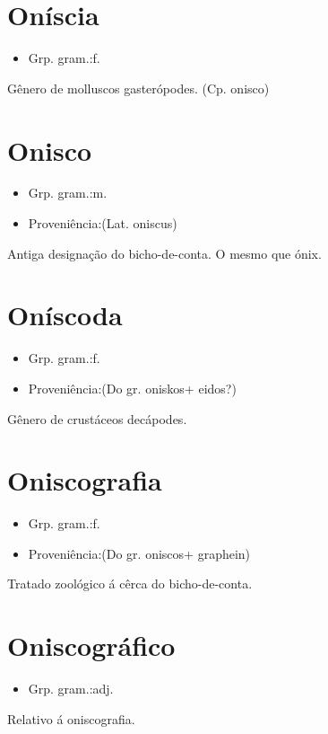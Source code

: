 \section{Oníscia}
\begin{itemize}
\item {Grp. gram.:f.}
\end{itemize}
Gênero de molluscos gasterópodes.
(Cp. \textunderscore onisco\textunderscore )
\section{Onisco}
\begin{itemize}
\item {Grp. gram.:m.}
\end{itemize}
\begin{itemize}
\item {Proveniência:(Lat. \textunderscore oniscus\textunderscore )}
\end{itemize}
Antiga designação do bicho-de-conta.
O mesmo que \textunderscore ónix\textunderscore .
\section{Oníscoda}
\begin{itemize}
\item {Grp. gram.:f.}
\end{itemize}
\begin{itemize}
\item {Proveniência:(Do gr. \textunderscore oniskos\textunderscore  + \textunderscore eidos\textunderscore ?)}
\end{itemize}
Gênero de crustáceos decápodes.
\section{Oniscografia}
\begin{itemize}
\item {Grp. gram.:f.}
\end{itemize}
\begin{itemize}
\item {Proveniência:(Do gr. \textunderscore oniscos\textunderscore  + \textunderscore graphein\textunderscore )}
\end{itemize}
Tratado zoológico á cêrca do bicho-de-conta.
\section{Oniscográfico}
\begin{itemize}
\item {Grp. gram.:adj.}
\end{itemize}
Relativo á oniscografia.
